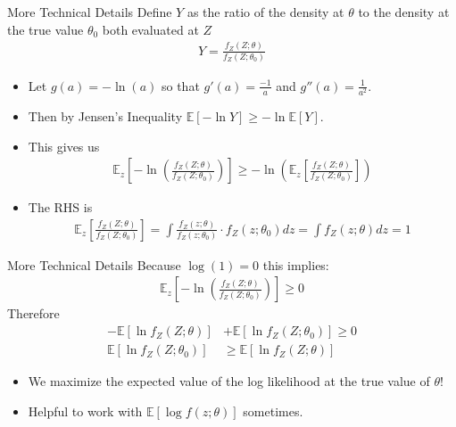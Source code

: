 \documentclass[aspectratio=169,11pt]{beamer}
\begin{document}
\begin{frame}{More Technical Details}
Define $Y$ as the ratio of the density at $\theta$ to the density at the true value $\theta_0$ both evaluated at $Z$
\begin{align*}
Y = \frac{f_Z(Z;\theta)}{f_Z(Z;\theta_0)}
\end{align*}
\vspace{-0.5cm}
\begin{itemize}
\item Let $g(a) = -\ln(a)$ so that $g'(a) = \frac{-1}{a}$ and $g''(a) =\frac{1}{a^2}$.
\item Then by \alert{Jensen's Inequality} $\mathbb{E}[- \ln Y] \geq - \ln \mathbb{E}[Y]$.
\item This gives us
\begin{align*}
\mathbb { E }_z \left[ - \ln \left( \frac { f _ { Z } ( Z ; \theta ) } { f _ { Z } \left( Z ; \theta _ { 0 } \right) } \right) \right] \geq - \ln \left( \mathbb { E }_z \left[ \frac { f _ { Z } ( Z ; \theta ) } { f _ { Z } \left( Z ; \theta _ { 0 } \right) } \right] \right)
\end{align*}
\item The RHS is
\begin{align*}
\mathbb { E }_z \left[ \frac { f _ { Z } ( Z ; \theta ) } { f _ { Z } \left( Z ; \theta _ { 0 } \right) } \right] = \int \frac { f _ { Z } ( z ; \theta ) } { f _ { Z } \left( z ; \theta _ { 0 } \right) } \cdot f _ { Z } \left( z ; \theta _ { 0 } \right) d z = \int f _ { Z } ( z ; \theta ) d z = 1
\end{align*}
\end{itemize}
\end{frame}


\begin{frame}{More Technical Details}
Because $\log(1)=0$ this implies:
\begin{align*}
\mathbb { E }_z \left[ - \ln \left( \frac { f _ { Z } ( Z ; \theta ) } { f _ { Z } \left( Z ; \theta _ { 0 } \right) } \right) \right] \geq 0
\end{align*}
Therefore 
\begin{align*}
- \mathbb { E } \left[ \ln f _ { Z } ( Z ; \theta ) \right] &+ \mathbb { E } \left[ \ln f _ { Z } \left( Z ; \theta _ { 0 } \right) \right] \geq 0\\
\mathbb { E } \left[ \ln f _ { Z } \left( Z ; \theta _ { 0 } \right) \right] &\geq \mathbb { E } \left[ \ln f _ { Z } ( Z ; \theta ) \right]
\end{align*}
\begin{itemize}
\item We maximize the expected value of the log likelihood at the true value of $\theta$!
\item Helpful to work with $\mathbb{E}[\log f(z; \theta)]$ sometimes.
\end{itemize}
\end{frame}
\end{document}

